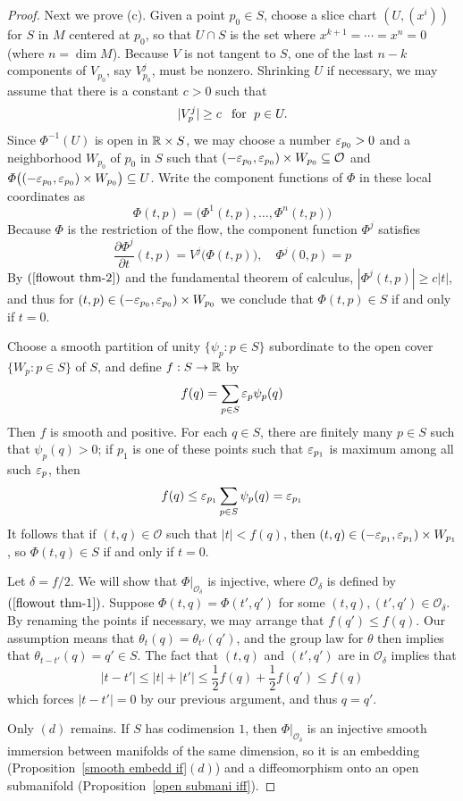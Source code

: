 \begin{proof}
Next we prove (c). Given a point $p_0\in S$, choose a slice chart $(U,(x^i))$ for $S$ in $M$ centered at $p_0$, so that $U\cap S$ is the set where $x^{k+1}=\cdots=x^n=0$ (where $n=\dim M$). Because $V$ is not tangent to $S$, one of the last $n-k$ components of $V_{p_0}$, say $V^j_{p_0}$, must be nonzero. Shrinking $U$ if necessary, we may assume that there is a constant $c>0$ such that
\begin{align}\label{flowout thm-2}
|V^j_p|\geq c\hspace{8pt}\text{for}\hspace{6pt} p\in U.
\end{align}
Since $\varPhi^{-1}(U)$ is open in $\mathbb{R}\times S$, we may choose a number $\varepsilon_{p_0}>0$ and a neighborhood $W_{p_0}$ of $p_0$ in $S$ such that $(-\varepsilon_{p_0},\varepsilon_{p_0})\times W_{p_0}\subseteq\mathcal{O}$ and $\varPhi\big((-\varepsilon_{p_0},\varepsilon_{p_0})\times W_{p_0}\big)\subseteq U$. Write the component functions of $\varPhi$ in these local coordinates as
\[\varPhi(t,p)=\big(\varPhi^1(t,p),\dots,\varPhi^n(t,p)\big)\]
Because $\varPhi$ is the restriction of the flow, the component function $\varPhi^j$ satisfies
\[\frac{\partial\varPhi^j}{\partial t}(t,p)=V^j\big(\varPhi(t,p)\big),\quad\varPhi^j(0,p)=p\]
By $(\ref{flowout thm-2})$ and the fundamental theorem of calculus, $|\varPhi^j(t,p)|\geq c|t|$, and thus for $(t,p)\in(-\varepsilon_{p_0},\varepsilon_{p_0})\times W_{p_0}$ we conclude that $\varPhi(t,p)\in S$ if and only if $t=0$.\par
Choose a smooth partition of unity $\{\psi_p:p\in S\}$ subordinate to the open cover $\{W_p:p\in S\}$ of $S$, and define $f:S\to\mathbb{R}$ by
\[f(q)=\sum_{p\in S}\varepsilon_p\psi_p(q)\]
Then $f$ is smooth and positive. For each $q\in S$, there are finitely many $p\in S$ such that $\psi_p(q)>0$; if $p_1$ is one of these points such that $\varepsilon_{p_1}$ is maximum among all such $\varepsilon_p$, then
\[f(q)\leq\varepsilon_{p_1}\sum_{p\in S}\psi_p(q)=\varepsilon_{p_1}\]
It follows that if $(t,q)\in\mathcal{O}$ such that $|t|<f(q)$, then $(t,q)\in(-\varepsilon_{p_1},\varepsilon_{p_1})\times W_{p_1}$, so $\varPhi(t,q)\in S$ if and only if $t=0$.\par
Let $\delta=f/2$. We will show that $\varPhi|_{\mathcal{O}_\delta}$ is injective, where $\mathcal{O}_{\delta}$ is defined by $(\ref{flowout thm-1})$. Suppose $\varPhi(t,q)=\varPhi(t',q')$ for some $(t,q),(t',q')\in\mathcal{O}_{\delta}$. By renaming the points if necessary, we may arrange that $f(q')\leq f(q)$. Our assumption means that $\theta_t(q)=\theta_{t'}(q')$, and the group law for $\theta$ then implies that $\theta_{t-t'}(q)=q'\in S$. The fact that $(t,q)$ and $(t',q')$ are in $\mathcal{O}_\delta$ implies that
\[|t-t'|\leq|t|+|t'|\leq\frac{1}{2}f(q)+\frac{1}{2}f(q')\leq f(q)\]
which forces $|t-t'|=0$ by our previous argument, and thus $q=q'$.\par
Only $(d)$ remains. If $S$ has codimension $1$, then $\varPhi|_{\mathcal{O}_\delta}$ is an injective smooth immersion between manifolds of the same dimension, so it is an embedding (Proposition~\ref{smooth embedd if}$(d)$) and a diffeomorphism onto an open submanifold (Proposition~\ref{open submani iff}).
\end{proof}
